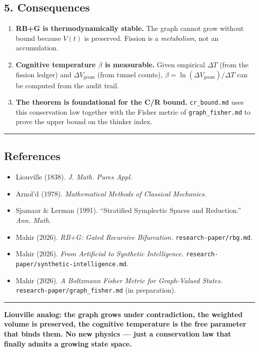 \documentclass[
  11pt,
  a4paper,
]{article}
\providecommand{\tightlist}{%
  \setlength{\itemsep}{0pt}\setlength{\parskip}{0pt}}
\begin{document}
\subsection{5. Consequences}\label{consequences}

\begin{enumerate}
\def\labelenumi{\arabic{enumi}.}
\tightlist
\item
  \textbf{RB+G is thermodynamically stable.} The graph cannot grow
  without bound because \(V(t)\) is preserved. Fission is a
  \emph{metabolism}, not an accumulation.
\item
  \textbf{Cognitive temperature \(\beta\) is measurable.} Given
  empirical \(\Delta T\) (from the fission ledger) and
  \(\Delta V_\text{geom}\) (from tunnel counts),
  \(\beta = \ln(\Delta V_\text{geom}) / \Delta T\) can be computed from
  the audit trail.
\item
  \textbf{The theorem is foundational for the C/R bound.}
  \texttt{cr\_bound.md} uses this conservation law together with the
  Fisher metric of \texttt{graph\_fisher.md} to prove the upper bound on
  the thinker index.
\end{enumerate}

\begin{center}\rule{0.5\linewidth}{0.5pt}\end{center}

\subsection{References}\label{references}

\begin{itemize}
\tightlist
\item
  Liouville (1838). \emph{J. Math. Pures Appl.}
\item
  Arnol'd (1978). \emph{Mathematical Methods of Classical Mechanics.}
\item
  Sjamaar \& Lerman (1991). ``Stratified Symplectic Spaces and
  Reduction.'' \emph{Ann. Math.}
\item
  Mahir (2026). \emph{RB+G: Gated Recursive Bifurcation.}
  \texttt{research-paper/rbg.md}.
\item
  Mahir (2026). \emph{From Artificial to Synthetic Intelligence.}
  \texttt{research-paper/synthetic-intelligence.md}.
\item
  Mahir (2026). \emph{A Boltzmann Fisher Metric for Graph-Valued
  States.} \texttt{research-paper/graph\_fisher.md} (in preparation).
\end{itemize}

\begin{center}\rule{0.5\linewidth}{0.5pt}\end{center}

\textbf{Liouville analog: the graph grows under contradiction, the
weighted volume is preserved, the cognitive temperature is the free
parameter that binds them. No new physics --- just a conservation law
that finally admits a growing state space.}
\end{document}
